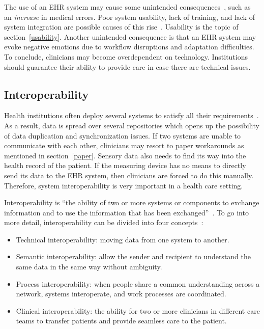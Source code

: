         The use of an EHR system may cause some unintended consequences~\cite{Campbell2006}, such as an \emph{increase} in medical errors. Poor system usability, lack of training, and lack of system integration are possible causes of this rise~\cite{Koppel2005}. Usability is the topic of section~\ref{usability}. Another unintended consequence is that an EHR system may evoke negative emotions due to workflow disruptions and adaptation difficulties. To conclude, clinicians may become overdependent on technology. Institutions should guarantee their ability to provide care in case there are technical issues.

    \subsection{Interoperability}\label{interoperability}

    Health institutions often deploy several systems to satisfy all their requirements~\cite{Payne2012}. As a result, data is spread over several repositories which opens up the possibility of data duplication and synchronization issues. If two systems are unable to communicate with each other, clinicians may resort to paper workarounds as mentioned in section~\ref{paper}. Sensory data also needs to find its way into the health record of the patient. If the measuring device has no means to directly send its data to the EHR system, then clinicians are forced to do this manually. Therefore, system interoperability is very important in a health care setting.

    Interoperability is ``the ability of two or more systems or components to exchange information and to use the information that has been exchanged''~\cite{IEEE1990}. To go into more detail, interoperability can be divided into four concepts~\cite{Benson2016}:
    \begin{itemize}
        \item Technical interoperability: moving data from one system to another.
        \item Semantic interoperability: allow the sender and recipient to understand the same data in the same way without ambiguity.
        \item Process interoperability: when people share a common understanding across a network, systems interoperate, and work processes are coordinated.
        \item Clinical interoperability: the ability for two or more clinicians in different care teams to transfer patients and provide seamless care to the patient.
    \end{itemize}

